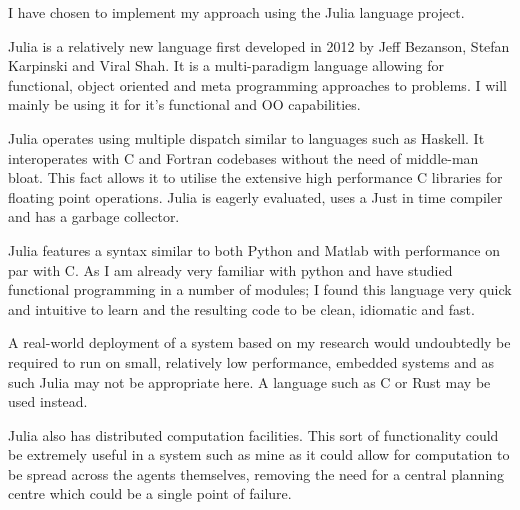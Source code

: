 I have chosen to implement my approach using the Julia language project\cite{JuliaProgrammingLanguage}.

Julia is a relatively new language first developed in 2012 by Jeff Bezanson, Stefan Karpinski and Viral Shah. It is a multi-paradigm language allowing for functional, object oriented and meta programming approaches to problems. I will mainly be using it for it's functional and OO capabilities.

Julia operates using multiple dispatch similar to languages such as Haskell. It interoperates with C and Fortran codebases without the need of middle-man bloat. This fact allows it to utilise the extensive high performance C libraries for floating point operations. Julia is eagerly evaluated, uses a Just in time compiler and has a garbage collector.

Julia features a syntax similar to both Python and Matlab with performance on par with C. As I am already very familiar with python and have studied functional programming in a number of modules; I found this language very quick and intuitive to learn and the resulting code to be clean, idiomatic and fast.

A real-world deployment of a system based on my research would undoubtedly be required to run on small, relatively low performance, embedded systems and as such Julia may not be appropriate here. A language such as C or Rust may be used instead.

Julia also has distributed computation facilities. This sort of functionality could be extremely useful in a system such as mine as it could allow for computation to be spread across the agents themselves, removing the need for a central planning centre which could be a single point of failure.





